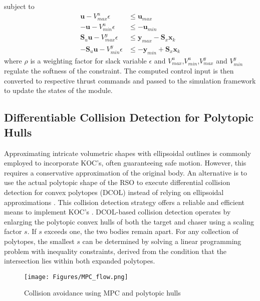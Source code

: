 subject to
\begin{align*}
\boldsymbol{u}-V^u_{max}\epsilon &\leq \boldsymbol{u}_{max}\\
-\boldsymbol{u}-V^u_{min}\epsilon &\leq -\boldsymbol{u}_{min}\\
\boldsymbol{S}_u\boldsymbol{u}-V^y_{max}\epsilon &\leq \boldsymbol{y}_{max}-\boldsymbol{S}_x\boldsymbol{x}_k\\
-\boldsymbol{S}_u\boldsymbol{u}-V^y_{min}\epsilon &\leq -\boldsymbol{y}_{min}+\boldsymbol{S}_x\boldsymbol{x}_k
\end{align*}
where $\rho$ is a weighting factor for slack variable $\epsilon$ and $V^u_{max}$,$V^u_{min}$,$V^y_{max}$ and $V^y_{min}$ regulate the softness of the constraint. The computed control input is then converted to respective thrust commands and passed to the simulation framework to update the states of the module. 

\subsection{Differentiable Collision Detection for Polytopic Hulls}\label{sec:DCOL}

Approximating intricate volumetric shapes with ellipsoidal outlines is commonly employed to incorporate KOC's, often guaranteeing safe motion. However, this requires a conservative approximation of the original body. An alternative is to use the actual polytopic shape of the RSO to execute differential collision detection for convex polytopes (DCOL) instead of relying on ellipsoidal approximations \cite{DCOL}. This collision detection strategy offers a reliable and efficient means to implement KOC's \cite{DCOL,Sow2024ACF}. DCOL-based collision detection operates by enlarging the polytopic convex hulls of both the target and chaser using a scaling factor $s$. If $s$ exceeds one, the two bodies remain apart. For any collection of polytopes, the smallest $s$ can be determined by solving a linear programming problem with inequality constraints, derived from the condition that the intersection lies within both expanded polytopes.

\begin{figure}[!t]
\centerline{\texttt{[image: Figures/MPC\_flow.png]}}
\caption{Collision avoidance using MPC and polytopic hulls}
\label{fig:MPC_flow}
\end{figure}

